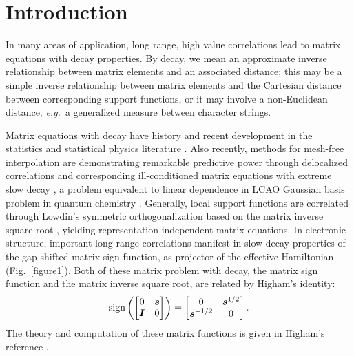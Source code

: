 \documentclass[letterpaper,twocolumn,amsmath,amsfont,amssymb,english,aps,jcp,preprintnumbers,groupaddress,nofootinbib,tightenlines,floatfix]{revtex4}
\newcommand{\mat}[1]{\boldsymbol{#1}}
\theoremstyle{plain}
\theoremstyle{remark}
\theoremstyle{plain}
\begin{document}
\section{Introduction}
In many areas of application, long range, high value correlations lead to matrix equations with decay properties.
By decay, we mean an approximate inverse relationship between matrix elements and an associated distance; 
this may be a simple inverse relationship between matrix elements and the Cartesian distance between
corresponding support functions, or it may involve a non-Euclidean distance, 
{\em  e.g.}~a generalized measure between character strings. 

Matrix equations with decay have history and recent development in the statistics and statistical physics literature
\cite{penrose1974,voit00, Anselin2003, Hardin2013, Krishtal2014}.   Also recently, methods for mesh-free interpolation 
are demonstrating remarkable predictive power through delocalized correlations and corresponding 
ill-conditioned matrix equations with extreme slow decay \cite{Schaback1995,schaback2006kernel,Fornberg2014,sarra2014}, 
a problem equivalent to linear dependence in LCAO Gaussian basis problem 
in quantum chemistry \cite{Rothlisberger2002,Jansik2007,helgaker2008molecular}.  Generally, local support functions are correlated 
through Lowdin's symmetric orthogonalization based on the matrix inverse square root \cite{Lowdin56}, 
yielding representation independent matrix equations. 
In electronic structure, important long-range correlations manifest in slow decay properties 
of the gap shifted matrix sign function, as projector of the effective Hamiltonian (Fig.~\ref{figure1}).  
Both of these matrix problem with decay, the matrix sign function and the matrix inverse square root, 
are related by Higham's identity:
\begin{equation}\label{highamsid}
\rm{sign} \left( \begin{bmatrix} 0 & \mat{s}      \\ \mat{I}       & 0\end{bmatrix} \right)  =
                 \begin{bmatrix} 0 & \mat{s}^{1/2} \\ \mat{s}^{-1/2} & 0\end{bmatrix}  .
\end{equation}
The theory and computation of these matrix functions is given in Higham's reference \cite{Higham08}.
\end{document}

